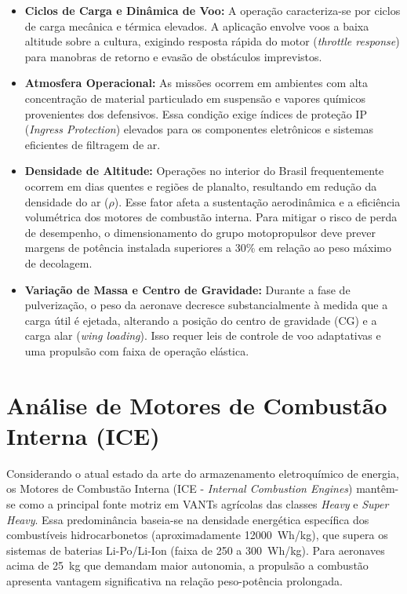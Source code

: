 \documentclass[a4paper,12pt]{article}
\begin{document}
\begin{itemize}
    \item \textbf{Ciclos de Carga e Dinâmica de Voo:} A operação caracteriza-se por ciclos de carga mecânica e térmica elevados. A aplicação envolve voos a baixa altitude sobre a cultura, exigindo resposta rápida do motor (\textit{throttle response}) para manobras de retorno e evasão de obstáculos imprevistos.
    
    \item \textbf{Atmosfera Operacional:} As missões ocorrem em ambientes com alta concentração de material particulado em suspensão e vapores químicos provenientes dos defensivos. Essa condição exige índices de proteção IP (\textit{Ingress Protection}) elevados para os componentes eletrônicos e sistemas eficientes de filtragem de ar.
    
    \item \textbf{Densidade de Altitude:} Operações no interior do Brasil frequentemente ocorrem em dias quentes e regiões de planalto, resultando em redução da densidade do ar ($\rho$). Esse fator afeta a sustentação aerodinâmica e a eficiência volumétrica dos motores de combustão interna. Para mitigar o risco de perda de desempenho, o dimensionamento do grupo motopropulsor deve prever margens de potência instalada superiores a 30\% em relação ao peso máximo de decolagem.
    
    \item \textbf{Variação de Massa e Centro de Gravidade:} Durante a fase de pulverização, o peso da aeronave decresce substancialmente à medida que a carga útil é ejetada, alterando a posição do centro de gravidade (CG) e a carga alar (\textit{wing loading}). Isso requer leis de controle de voo adaptativas e uma propulsão com faixa de operação elástica.
\end{itemize}   

\section{Análise de Motores de Combustão Interna (ICE)}

Considerando o atual estado da arte do armazenamento eletroquímico de energia, os Motores de Combustão Interna (ICE - \textit{Internal Combustion Engines}) mantêm-se como a principal fonte motriz em VANTs agrícolas das classes \textit{Heavy} e \textit{Super Heavy}. Essa predominância baseia-se na densidade energética específica dos combustíveis hidrocarbonetos (aproximadamente \SI{12000}{Wh/kg}), que supera os sistemas de baterias Li-Po/Li-Ion (faixa de 250 a \SI{300}{Wh/kg}). Para aeronaves acima de \SI{25}{kg} que demandam maior autonomia, a propulsão a combustão apresenta vantagem significativa na relação peso-potência prolongada.
\end{document}
